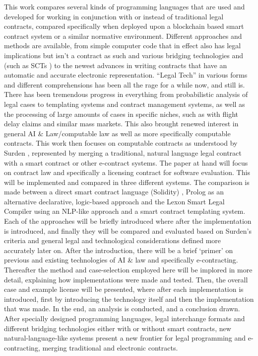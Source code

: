 \documentclass{article}
\begin{document}
This work compares several kinds of programming languages that are used and developed for working in conjunction with or instead of traditional legal contracts, compared specifically when deployed upon a blockchain based smart contract system or a similar normative environment.
Different approaches and methods are available, from simple computer code that in effect also has legal implications but isn’t a contract as such and various bridging technologies and (such as SCTs \cite{wongmengComputableContractsAcademia2018}) to the newest advances in writing contracts that have an automatic and accurate electronic representation.
“Legal Tech” in various forms and different comprehensions has been all the rage for a while now, and still is. \cite{braegelmannRechtshandbuchLegalTech2019}  There has been tremendous progress in everything from probabilistic analysis of legal cases to templating systems and contract management systems, as well as the processing of large amounts of cases in specific niches, such as with flight delay claims and similar mass markets. This also brought renewed interest in general AI \& Law/computable law as well as more specifically computable contracts. This work then focuses on computable contracts as understood by Surden \cite{surdenComputableContracts2012}, represented by merging a traditional, natural language legal contract with a smart contract or other e-contract systems. %
The paper at hand will focus on contract law and specifically a licensing contract for software evaluation. This will be implemented and compared in three different systems. The comparison is made between a direct smart contract language (Solidity) \cite{EthereumSolidity2020}, Prolog \cite{SWIPrologManual} as an alternative declarative, logic-based approach and the Lexon  \cite{diedrichLexonBibleHitchhiker2020} Smart Legal Compiler  using an NLP-like approach and a smart contract templating system.
Each of the approaches will be briefly introduced where after the implementation is introduced, and finally they will be compared and evaluated based on Surden’s criteria and general legal and technological considerations defined more accurately later on.
After the introduction, there will be a brief ‘primer’ on previous and existing technologies of AI \& law and specifically e-contracting. %
Thereafter the method and case-selection employed here will be implored in more detail, explaining how implementations were made and tested. Then, the overall case and example license will be presented, where after each implementation is introduced, first by introducing the technology itself and then the implementation that was made. In the end, an analysis is conducted, and a conclusion drawn.
After specially designed programming languages, legal interchange formats and different bridging technologies either with or without smart contracts, new natural-language-like systems present a new frontier for legal programming and e-contracting, merging traditional and electronic contracts. 
\end{document}
